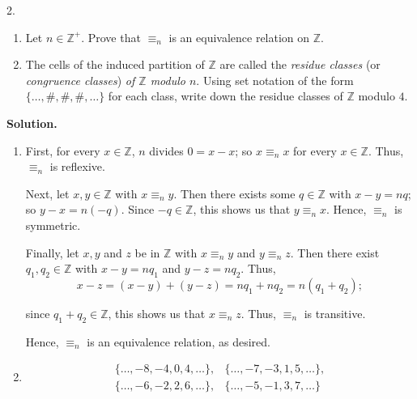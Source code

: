 \documentclass[10pt,]{book}
\theoremstyle{plain}
\theoremstyle{definition}
\theoremstyle{definition}
\theoremstyle{definition}
\theoremstyle{definition}
\numberwithin{equation}{section}
\def\Z{\mathbb{Z}}
\newcommand{\amp}{ & }
\begin{document}
\begin{exerciselist}
\begin{equation*}
\end{equation*}
\item[2.]\hypertarget{exercise-51}{}\leavevmode%
\begin{enumerate}[label=(\alph*)]
\item\hypertarget{li-416}{}
            Let  \(n\in \Z^+\). Prove that  \(\equiv_n\) is an equivalence relation on \(\Z\).
\item\hypertarget{li-417}{}
            The cells of the induced partition of \(\Z\) are called
            the \emph{residue classes} (or \emph{congruence classes}) \emph{of \(\Z\) modulo \(n\)}.  Using
            set notation of the form \(\{\ldots,\#, \#,\#,\ldots\}\)
            for each class, write down the residue classes of \(\Z\)
            modulo \(4\).
\end{enumerate}
\par\smallskip
\par\smallskip
\noindent\textbf{Solution.}\hypertarget{solution-51}{}\quad
\leavevmode%
\begin{enumerate}[label=(\alph*)]
\item\hypertarget{li-418}{}
          First, for every \(x \in \Z\), \(n\)
          divides \(0=x-x\); so \(x\equiv_n x\) for every \(x\in
          \Z\).  Thus, \(\equiv_n\) is reflexive.

          Next, let \(x,y \in \Z\) with \(x\equiv_n y\).  Then
          there exists some \(q\in \Z\) with \(x-y=nq\); so \(y-x=n(-q)\).
          Since \(-q\in \Z\), this shows us that \(y\equiv_n x\).  Hence,
          \(\equiv_n\) is symmetric.

          Finally, let \(x,y\) and \(z\) be in \(\Z\) with \(x\equiv_n
          y\) and \(y\equiv_nz\).  Then there exist \(q_1,q_2 \in \Z\) with
          \(x-y=nq_1\) and \(y-z=nq_2\).  Thus,
\begin{equation*}

            x-z=(x-y)+(y-z)=nq_1+nq_2=n(q_1+q_2);
          
\end{equation*}

          since \(q_1+q_2 \in \Z\),
          this shows us that \(x\equiv_n z\).  Thus, \(\equiv_n\) is transitive.

          Hence, \(\equiv_n\) is an equivalence relation, as desired.
\item\hypertarget{li-419}{}
\begin{align*}
\{\ldots,-8,-4,0,4,\ldots\},\amp 
            \{\ldots,-7,-3,1,5,\ldots\},\\
\{\ldots,-6,-2,2,6,\ldots\},\amp 
            \{\ldots,-5,-1,3,7,\ldots\}
\end{align*}


\end{enumerate}
\end{exerciselist}
\end{document}
